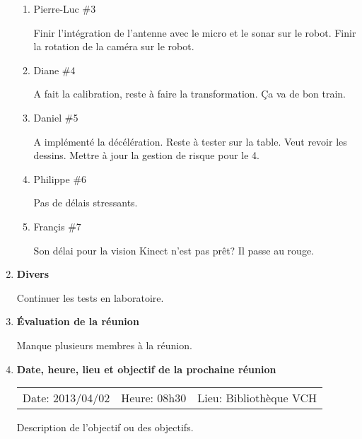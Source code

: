 \documentclass[12pt]{ULojpv}
\begin{document}
\begin{enumerate}
\begin{enumerate}
\item Pierre-Luc  \#3

Finir l'intégration de l'antenne avec le micro et le sonar sur le robot. Finir la rotation de la caméra sur le robot.

\item Diane  \#4

A fait la calibration, reste à faire la transformation. Ça va de bon train.

\item Daniel  \#5

A implémenté la décélération. Reste à tester sur la table. Veut revoir les dessins. Mettre à jour la gestion de risque pour le 4.

\item Philippe  \#6

Pas de délais stressants.

\item Françis  \#7

Son délai pour la vision Kinect n'est pas prêt? Il passe au rouge.

\end{enumerate}




\item \textbf{Divers}

Continuer les tests en laboratoire.



\item \textbf{Évaluation de la réunion}

Manque plusieurs membres à la réunion.

\item \textbf{Date, heure, lieu et objectif de la prochaine réunion}

\begin{tabular}{@{}lll}
   Date: 2013/04/02
   & Heure: 08h30
   &  Lieu: Bibliothèque VCH
\end{tabular}
\par
Description de l'objectif ou des objectifs.


\end{enumerate}
\end{document}
